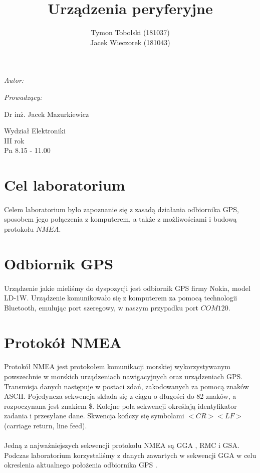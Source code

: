 \documentclass[wide,a4paper,titlepage,12pt] {article}
\title{Urządzenia peryferyjne}
\author{Tymon Tobolski (181037)\\ Jacek Wieczorek (181043)}
\makeatletter
\renewcommand{\maketitle}{
\begin{titlepage}
  \begin{center}
    \vspace*{3cm}
    \LARGE \@title \par
    \vspace{2cm}
    \textit{\small Autor:}\par
    \normalsize \@author\par \normalsize
    \vspace{3cm}
    \textit{\small Prowadzący:}\par
    Dr inż. Jacek Mazurkiewicz \par
    \vspace{2cm}
    Wydział Elektroniki\\ III rok\\ Pn 8.15 - 11.00\par
    \vspace{4cm}
    \small \@date
  \end{center}
\end{titlepage}
}
\makeatother
\begin{document}
\maketitle

\section{Cel laboratorium}
\paragraph{}
Celem laboratorium było zapoznanie się z zasadą działania odbiornika GPS, sposobem jego połączenia z komputerem, a także z możliwościami i budową protokołu $NMEA$.

\section{Odbiornik GPS}
\paragraph{}
Urządzenie jakie mieliśmy do dyspozycji jest odbiornik GPS firmy Nokia, model LD-1W. Urządzenie komunikowało się z komputerem za pomocą technologii Bluetooth, emulując port szeregowy, w naszym przypadku port $COM120$.

\section{Protokół NMEA}
\paragraph{}
Protokół NMEA jest protokołem komunikacji morskiej wykorzystywanym powszechnie w morskich urządzeniach nawigacyjnych oraz urządzeniach GPS. Transmisja danych następuje w postaci zdań, zakodowanych za pomocą znaków ASCII. Pojedyncza sekwencja składa się z ciągu o długości do 82 znaków, a rozpoczynana jest znakiem \$. Kolejne pola sekwencji określają identyfikator zadania i przesyłane dane. Skwencja kończy się symbolami $<CR><LF>$ (carriage return, line feed).

\paragraph{}
Jedną z najważniejszych sekwencji protokołu NMEA są GGA , RMC i GSA. Podczas laboratorium korzystaliśmy z danych zawartych w sekwencji GGA w celu okreslenia aktualnego położenia odbiornika GPS .
\end{document}
